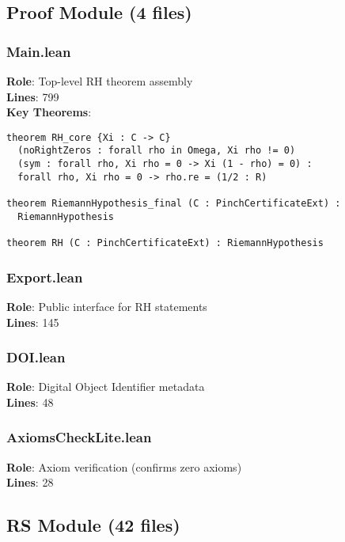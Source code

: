 \documentclass[12pt,a4paper]{article}
\begin{document}
\subsection{Proof Module (4 files)}

\subsubsection{Main.lean}
\textbf{Role}: Top-level RH theorem assembly\\
\textbf{Lines}: 799\\
\textbf{Key Theorems}:
\begin{lstlisting}[language=Lean]
theorem RH_core {Xi : C -> C}
  (noRightZeros : forall rho in Omega, Xi rho != 0)
  (sym : forall rho, Xi rho = 0 -> Xi (1 - rho) = 0) :
  forall rho, Xi rho = 0 -> rho.re = (1/2 : R)

theorem RiemannHypothesis_final (C : PinchCertificateExt) :
  RiemannHypothesis

theorem RH (C : PinchCertificateExt) : RiemannHypothesis
\end{lstlisting}

\subsubsection{Export.lean}
\textbf{Role}: Public interface for RH statements\\
\textbf{Lines}: 145

\subsubsection{DOI.lean}
\textbf{Role}: Digital Object Identifier metadata\\
\textbf{Lines}: 48

\subsubsection{AxiomsCheckLite.lean}
\textbf{Role}: Axiom verification (confirms zero axioms)\\
\textbf{Lines}: 28

\subsection{RS Module (42 files)}
\end{document}
